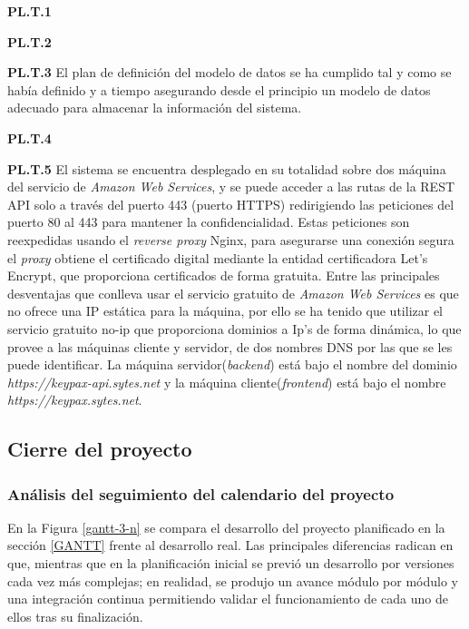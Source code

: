 \documentclass{article}
\begin{document}
\textbf{PL.T.1}

\textbf{PL.T.2} %

\textbf{PL.T.3}
El plan de definición del modelo de datos se ha cumplido tal y como se había definido y a tiempo asegurando desde el principio un modelo de datos adecuado para almacenar la información del sistema.

\textbf{PL.T.4} %


\textbf{PL.T.5}
El sistema se encuentra desplegado en su totalidad sobre dos máquina del servicio de \textit{Amazon Web Services}, y se puede acceder a las rutas de la REST API solo a través del puerto 443 (puerto HTTPS) redirigiendo las peticiones del puerto 80 al 443 para mantener la confidencialidad. Estas peticiones son reexpedidas usando el \textit{reverse proxy} Nginx, para asegurarse una conexión segura el \textit{proxy} obtiene el certificado digital mediante la entidad certificadora Let's Encrypt, que proporciona certificados de forma gratuita.
Entre las principales desventajas que conlleva usar el servicio gratuito de \textit{Amazon Web Services} es que no ofrece una IP estática para la máquina, por ello se ha tenido que utilizar el servicio gratuito no-ip que proporciona dominios a Ip's de forma dinámica, lo que provee a las máquinas cliente y servidor, de dos nombres DNS por las que se les puede identificar. La máquina servidor(\textit{backend}) está bajo el nombre del dominio \textit{https://keypax-api.sytes.net} y la máquina cliente(\textit{frontend}) está bajo el nombre \textit{https://keypax.sytes.net}.




\subsection{Cierre del proyecto}

\subsubsection*{Análisis del seguimiento del calendario del proyecto}

En la Figura \ref{gantt-3-n} se compara el desarrollo del proyecto planificado en la sección \ref{GANTT} frente al desarrollo real. Las principales diferencias radican en que, mientras que en la planificación inicial se previó un desarrollo por versiones cada vez más complejas; en realidad, se produjo un avance módulo por módulo y una integración continua permitiendo validar el funcionamiento de cada uno de ellos tras su finalización.
\end{document}
